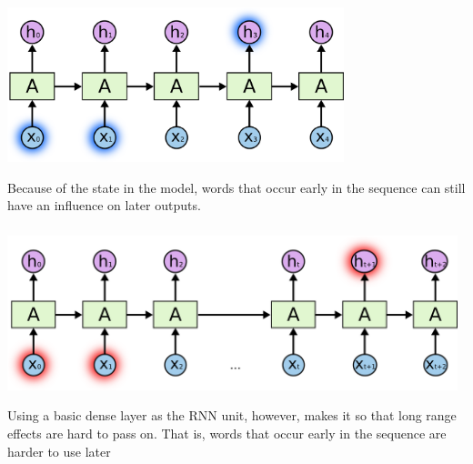 \documentclass[xetex,mathserif,serif,aspectratio=169]{beamer}
\begin{document}
\begin{frame}[fragile] \frametitle{} \oldB \small


\end{frame}

\begin{frame}[fragile] \frametitle{} \oldB \small

\begin{center}
\includegraphics[height=4.5cm]{img/cloah03.png}
\end{center}

Because of the state in the model, words that occur
early in the sequence can still have an influence on
later outputs.

\end{frame}

\begin{frame}[fragile] \frametitle{} \oldB \small

\begin{center}
\includegraphics[height=4.5cm]{img/cloah04.png}
\end{center}

Using a basic dense layer as the RNN unit, however, makes it
so that long range effects are hard to pass on. That is, words
that occur early in the sequence are harder to use later

\end{frame}
\end{document}
